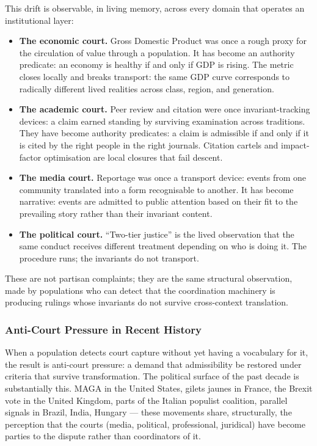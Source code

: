 \documentclass[
]{article}
\providecommand{\tightlist}{%
  \setlength{\itemsep}{0pt}\setlength{\parskip}{0pt}}
\begin{document}
This drift is observable, in living memory, across every domain
that operates an institutional layer:

\begin{itemize}
\tightlist
\item
  \textbf{The economic court.} Gross Domestic Product was once a
  rough proxy for the circulation of value through a population.
  It has become an authority predicate: an economy is healthy if
  and only if GDP is rising. The metric closes locally and breaks
  transport: the same GDP curve corresponds to radically different
  lived realities across class, region, and generation.
\item
  \textbf{The academic court.} Peer review and citation were once
  invariant-tracking devices: a claim earned standing by surviving
  examination across traditions. They have become authority
  predicates: a claim is admissible if and only if it is cited by
  the right people in the right journals. Citation cartels and
  impact-factor optimisation are local closures that fail descent.
\item
  \textbf{The media court.} Reportage was once a transport device:
  events from one community translated into a form recognisable to
  another. It has become narrative: events are admitted to public
  attention based on their fit to the prevailing story rather than
  their invariant content.
\item
  \textbf{The political court.} ``Two-tier justice'' is the lived
  observation that the same conduct receives different treatment
  depending on who is doing it. The procedure runs; the invariants
  do not transport.
\end{itemize}

These are not partisan complaints; they are the same structural
observation, made by populations who can detect that the
coordination machinery is producing rulings whose invariants do not
survive cross-context translation.

\subsubsection{Anti-Court Pressure in Recent
History}\label{anti-court-pressure-recent}

When a population detects court capture without yet having a
vocabulary for it, the result is anti-court pressure: a demand
that admissibility be restored under criteria that survive
transformation. The political surface of the past decade is
substantially this. MAGA in the United States, gilets jaunes in
France, the Brexit vote in the United Kingdom, parts of the
Italian populist coalition, parallel signals in Brazil, India,
Hungary --- these movements share, structurally, the perception
that the courts (media, political, professional, juridical) have
become parties to the dispute rather than coordinators of it.
\end{document}
